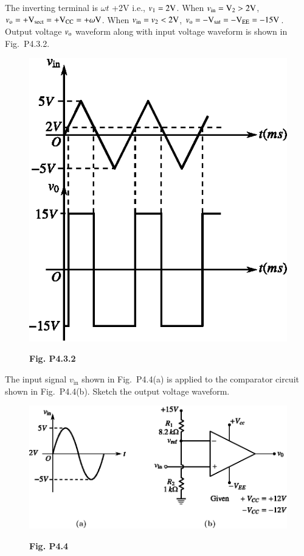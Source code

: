 \begin{solution}
The inverting terminal is $\omega t$ +2V i.e., $v_{1}=2\textrm{V}$. When $v_{\text{in}}=\textrm{V}_{2}>2\textrm{V}$, $v_{\textrm{o}}=+\textrm{V}_{\text{sect}}=+\textrm{V}_{\text{CC}}=+\omega \textrm{V}$. When $v_{\text{in}}=v_{2}<2\textrm{V}$, $v_{\textrm{o}}=-\textrm{V}_{\text{sat}}=-\textrm{V}_{\text{EE}}=-15\textrm{V}$. Output voltage $v_{\textrm{o}}$ waveform along with input voltage waveform is shown in Fig.~P4.3.2.
\begin{figure}[H]
\centering
\includegraphics{chap4/figP4.3.2.eps}

\smallskip
{\bf Fig. P4.3.2}
\end{figure}
\end{solution}

\begin{problem}\label{prob4.4}
The input signal $v_{\text{in}}$ shown in Fig.~P4.4(a) is applied to the comparator circuit shown in Fig.~P4.4(b). Sketch the output voltage waveform.
\begin{figure}[H]
\centering
\includegraphics{chap4/figP4.4.eps}

\smallskip
{\bf Fig. P4.4}
\end{figure}
\end{problem}

